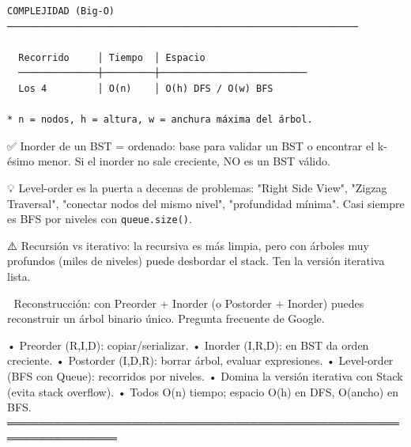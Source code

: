 \begin{lstlisting}
COMPLEJIDAD (Big-O)
──────────────────────────────────────────────────────────────

  Recorrido     │ Tiempo  │ Espacio
  ──────────────┼─────────┼──────────────────────────
  Los 4         │ O(n)    │ O(h) DFS / O(w) BFS

* n = nodos, h = altura, w = anchura máxima del árbol.
\end{lstlisting}

\begin{dsaentrevistas}

✅ Inorder de un BST = ordenado: base para validar un BST o encontrar el
   k-ésimo menor. Si el inorder no sale creciente, NO es un BST válido.

💡 Level-order es la puerta a decenas de problemas: "Right Side View",
   "Zigzag Traversal", "conectar nodos del mismo nivel", "profundidad
   mínima". Casi siempre es BFS por niveles con \verb|queue.size()|.

⚠️ Recursión vs iterativo: la recursiva es más limpia, pero con árboles
   muy profundos (miles de niveles) puede desbordar el stack. Ten la
   versión iterativa lista.

🔑 Reconstrucción: con Preorder + Inorder (o Postorder + Inorder) puedes
   reconstruir un árbol binario único. Pregunta frecuente de Google.

\end{dsaentrevistas}

\begin{dsaresumen}

• Preorder (R,I,D): copiar/serializar.
• Inorder (I,R,D): en BST da orden creciente.
• Postorder (I,D,R): borrar árbol, evaluar expresiones.
• Level-order (BFS con Queue): recorridos por niveles.
• Domina la versión iterativa con Stack (evita stack overflow).
• Todos O(n) tiempo; espacio O(h) en DFS, O(ancho) en BFS.
════════════════════════════════════════════════════════════════

\end{dsaresumen}
